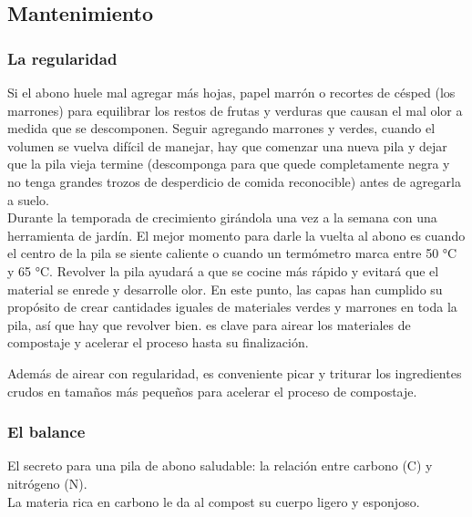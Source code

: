 \documentclass[../main.tex]{subfiles}
\begin{document}
\subsection{Mantenimiento}

\subsubsection{La regularidad}

Si el abono huele mal agregar más hojas, papel marrón o recortes de césped (los marrones) para equilibrar los restos de frutas y verduras que causan el mal olor a medida que se descomponen. Seguir agregando marrones y verdes, cuando el volumen se vuelva difícil de manejar, hay que comenzar una nueva pila y dejar que la pila vieja termine (descomponga para que quede completamente negra y no tenga grandes trozos de desperdicio de comida reconocible) antes de agregarla a suelo.\\

Durante la temporada de crecimiento  girándola una vez a la semana con una herramienta de jardín. El mejor momento para darle la vuelta al abono es cuando el centro de la pila se siente caliente o cuando un termómetro marca entre 50 °C y 65 °C. Revolver la pila ayudará a que se cocine más rápido y evitará que el material se enrede y desarrolle olor. En este punto, las capas han cumplido su propósito de crear cantidades iguales de materiales verdes y marrones en toda la pila, así que hay que revolver bien.  es clave para airear los materiales de compostaje y acelerar el proceso hasta su finalización.\\

\begin{recuadroV}
    Además de airear con regularidad, es conveniente picar y triturar los ingredientes crudos en tamaños más pequeños para acelerar el proceso de compostaje.
\end{recuadroV}

\subsubsection{El balance}

El secreto para una pila de abono saludable: la relación entre carbono ({\color{CompostGreen!50!black}C}) y nitrógeno ({\color{CompostGreen!50!black}N}).\\

La materia rica en carbono le da al compost su cuerpo ligero y esponjoso.
\end{document}
